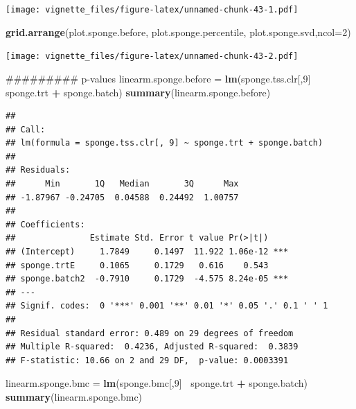 \documentclass[]{book}
\newenvironment{Shaded}{\begin{snugshade}}{\end{snugshade}}
\newcommand{\KeywordTok}[1]{\textcolor[rgb]{0.13,0.29,0.53}{\textbf{#1}}}
\newcommand{\DataTypeTok}[1]{\textcolor[rgb]{0.13,0.29,0.53}{#1}}
\newcommand{\DecValTok}[1]{\textcolor[rgb]{0.00,0.00,0.81}{#1}}
\newcommand{\StringTok}[1]{\textcolor[rgb]{0.31,0.60,0.02}{#1}}
\newcommand{\OperatorTok}[1]{\textcolor[rgb]{0.81,0.36,0.00}{\textbf{#1}}}
\newcommand{\NormalTok}[1]{#1}
\begin{document}
\texttt{[image: vignette\_files/figure-latex/unnamed-chunk-43-1.pdf]}

\begin{Shaded}
\begin{Highlighting}[]
\KeywordTok{grid.arrange}\NormalTok{(plot.sponge.before, plot.sponge.percentile, plot.sponge.svd,}\DataTypeTok{ncol=}\DecValTok{2}\NormalTok{)}
\end{Highlighting}
\end{Shaded}

\texttt{[image: vignette\_files/figure-latex/unnamed-chunk-43-2.pdf]}

\begin{Shaded}
\begin{Highlighting}[]
\NormalTok{######### p-values}
\NormalTok{linearm.sponge.before =}\StringTok{ }\KeywordTok{lm}\NormalTok{(sponge.tss.clr[,}\DecValTok{9}\NormalTok{]}\OperatorTok{~}\StringTok{ }\NormalTok{sponge.trt }\OperatorTok{+}\StringTok{ }\NormalTok{sponge.batch)}
\KeywordTok{summary}\NormalTok{(linearm.sponge.before)}
\end{Highlighting}
\end{Shaded}

\begin{verbatim}
## 
## Call:
## lm(formula = sponge.tss.clr[, 9] ~ sponge.trt + sponge.batch)
## 
## Residuals:
##      Min       1Q   Median       3Q      Max 
## -1.87967 -0.24705  0.04588  0.24492  1.00757 
## 
## Coefficients:
##               Estimate Std. Error t value Pr(>|t|)    
## (Intercept)     1.7849     0.1497  11.922 1.06e-12 ***
## sponge.trtE     0.1065     0.1729   0.616    0.543    
## sponge.batch2  -0.7910     0.1729  -4.575 8.24e-05 ***
## ---
## Signif. codes:  0 '***' 0.001 '**' 0.01 '*' 0.05 '.' 0.1 ' ' 1
## 
## Residual standard error: 0.489 on 29 degrees of freedom
## Multiple R-squared:  0.4236, Adjusted R-squared:  0.3839 
## F-statistic: 10.66 on 2 and 29 DF,  p-value: 0.0003391
\end{verbatim}

\begin{Shaded}
\begin{Highlighting}[]
\NormalTok{linearm.sponge.bmc =}\StringTok{ }\KeywordTok{lm}\NormalTok{(sponge.bmc[,}\DecValTok{9}\NormalTok{]}\OperatorTok{~}\StringTok{ }\NormalTok{sponge.trt }\OperatorTok{+}\StringTok{ }\NormalTok{sponge.batch)}
\KeywordTok{summary}\NormalTok{(linearm.sponge.bmc)}
\end{Highlighting}
\end{Shaded}
\end{document}
